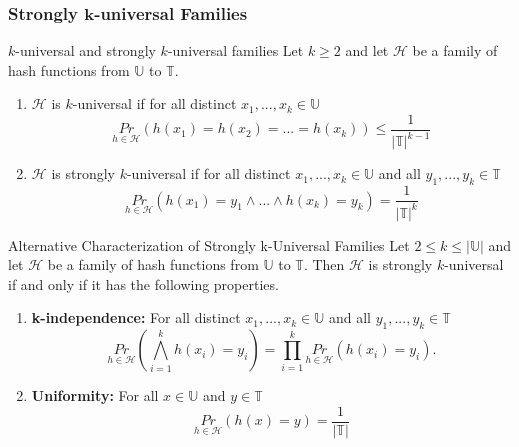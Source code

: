 \documentclass[english]{panikzettel}
\begin{document}
\subsubsection{Strongly $\mathbf{k}$-universal Families}
\begin{defi}{$k$-universal and strongly $k$-universal families}
Let $k\geq 2$ and let $\mathcal{H}$ be a family of hash functions from $\mathbb{U}$ to $\mathbb{T}$.
\begin{enumerate}
\item $\mathcal{H}$ is $k$-universal if for all distinct $x_1,...,x_k\in\mathbb{U}$
\[
\underset{h\in\mathcal{H}}{Pr}(h(x_1)=h(x_2)=...=h(x_k))\leq \frac{1}{|\mathbb{T}|^{k-1}}
\]
\item $\mathcal{H}$ is strongly $k$-universal if for all distinct $x_1,...,x_k\in\mathbb{U}$ and all $y_1,...,y_k\in\mathbb{T}$
\[
\underset{h\in\mathcal{H}}{Pr}(h(x_1)=y_1\wedge...\wedge h(x_k)=y_k)=\frac{1}{|\mathbb{T}|^k}
\]
\end{enumerate}
\end{defi}


\begin{theo}{Alternative Characterization of Strongly k-Universal Families}
Let $2\leq k\leq |\mathbb{U}|$ and let $\mathcal{H}$ be a family of hash functions from $\mathbb{U}$ to $\mathbb{T}$. Then $\mathcal{H}$ is strongly $k$-universal if and only if it has the following properties.
\begin{enumerate}
\item \textbf{k-independence:} For all distinct $x_1,...,x_k\in\mathbb{U}$ and all $y_1,...,y_k\in\mathbb{T}$
\[
\underset{h\in\mathcal{H}}{Pr}\left( \bigwedge_{i=1}^k h(x_i)=y_i \right) = \prod_{i=1}^k \underset{h\in\mathcal{H}}{Pr}(h(x_i)=y_i).
\]
\item \textbf{Uniformity:} For all $x\in\mathbb{U}$ and $y\in\mathbb{T}$
\[
\underset{h\in\mathcal{H}}{Pr} (h(x)=y)=\frac{1}{|\mathbb{T}|}
\]
\end{enumerate}
\end{theo}
\end{document}
